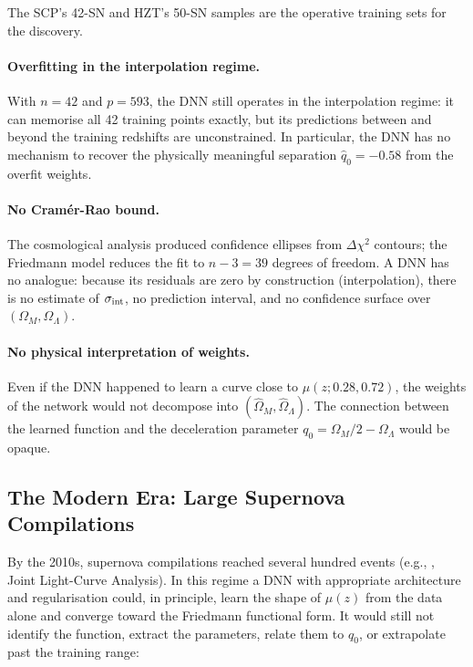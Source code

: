 \documentclass[12pt]{article}
\begin{document}
The SCP's 42-SN and HZT's 50-SN samples are the operative training sets
for the discovery.

\paragraph{Overfitting in the interpolation regime.}
With $n = 42$ and $p = 593$, the DNN still operates in the interpolation
regime: it can memorise all 42 training points exactly,
but its predictions between and beyond the training redshifts are
unconstrained.  In particular, the DNN has no mechanism to recover the
physically meaningful separation $\hat q_0 = -0.58$ from the overfit
weights.

\paragraph{No Cramér-Rao bound.}
The cosmological analysis produced confidence ellipses from
$\Delta\chi^2$ contours; the Friedmann model reduces the fit to
$n - 3 = 39$ degrees of freedom.  A DNN has no
analogue: because its residuals are zero by construction (interpolation),
there is no estimate of $\sigma_{\rm int}$, no prediction interval,
and no confidence surface over $(\Omega_M, \Omega_\Lambda)$.

\paragraph{No physical interpretation of weights.}
Even if the DNN happened to learn a curve close to $\mu(z;0.28,0.72)$,
the weights of the network would not decompose into $(\hat\Omega_M,
\hat\Omega_\Lambda)$.  The connection between the learned function and
the deceleration parameter $q_0 = \Omega_M/2 - \Omega_\Lambda$ would be
opaque.

\subsection{The Modern Era: Large Supernova Compilations}

By the 2010s, supernova compilations reached several hundred events
(e.g., \citealt{Conley2011}, Joint Light-Curve Analysis).  In this
regime a DNN with appropriate architecture and regularisation could,
in principle, learn the shape of $\mu(z)$ from the data alone and
converge toward the Friedmann functional form.  It would still not identify
the function, extract the parameters, relate them to $q_0$, or extrapolate
past the training range:
\end{document}

